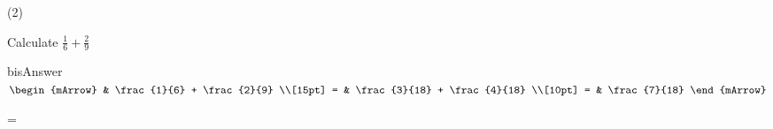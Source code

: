 \clearpage\indent%
\begin{mtask}(2)
   \task \begin{exercise} Calculate $ \frac{1}{6} + \frac{2}{9} $
           \begin{envOut}{bisAnswer}
             $\begin{mArrow} 
			       & \frac{1}{6} +  \frac{2}{9}             \\[15pt]
                 = & \frac{3}{18} + \frac{4}{18}             \\[10pt]
		   		 = & \frac{7}{18}
              \end{mArrow}$
            \begin{shortsolution}  
			     =$ \quad \quad \quad \quad$
			\end{shortsolution}				 
           \end{envOut}
         \end{exercise}


\end{mtask}
